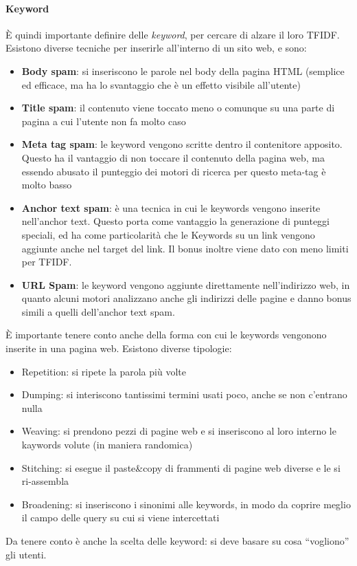 \paragraph*{Keyword}\`E quindi importante definire delle \textit{keyword}, per cercare di alzare il loro TFIDF. Esistono diverse tecniche per inserirle all'interno di un sito web, e sono:
\begin{itemize}

\item \textbf{Body spam}: si inseriscono le parole nel body della pagina HTML (semplice ed efficace, ma ha lo svantaggio che \`e un effetto visibile all'utente)
\item \textbf{Title spam}: il contenuto viene toccato meno o comunque su una parte di pagina a cui l'utente non fa molto caso
\item \textbf{Meta tag spam}: le keyword vengono scritte dentro il contenitore apposito. Questo ha il vantaggio di non toccare il contenuto della pagina web, ma essendo abusato il punteggio dei motori di ricerca per questo meta-tag \`e molto basso
\item \textbf{Anchor text spam}: \`e una tecnica in cui le keywords vengono inserite nell'anchor text. Questo porta come vantaggio la generazione di punteggi speciali, ed ha come particolarit\`a che le Keywords su un link vengono aggiunte anche nel target del link. Il bonus inoltre viene dato con meno limiti per TFIDF.
\item \textbf{URL Spam}: le keyword vengono aggiunte direttamente nell'indirizzo web, in quanto alcuni motori analizzano anche gli indirizzi delle pagine e danno bonus simili a quelli dell'anchor text spam.

\end{itemize}

\`E importante tenere conto anche della forma con cui le keywords vengonono inserite in una pagina web. Esistono diverse tipologie:
\begin{itemize}

\item Repetition: si ripete la parola pi\`u volte
\item Dumping: si interiscono tantissimi termini usati poco, anche se non c'entrano nulla
\item Weaving: si prendono pezzi di pagine web e si inseriscono al loro interno le kaywords volute (in maniera randomica)
\item Stitching: si esegue il paste\&copy di frammenti di pagine web diverse e le si ri-assembla
\item Broadening: si inseriscono i sinonimi alle keywords, in modo da coprire meglio il campo delle query su cui si viene intercettati

\end{itemize}

Da tenere conto \`e anche la scelta delle keyword: si deve basare su cosa ``vogliono'' gli utenti.
